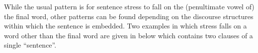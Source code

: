 While the usual pattern is for sentence stress to fall
on the (penultimate vowel of) the final word,
other patterns can be found depending on the discourse
structures within which the sentence is embedded.
Two examples in which stress falls on a word other than
the final word are given in  below
which contains two clauses of a single ``sentence''.

\begin{exe}
\let\eachwordone=\textnormal \let\eachwordtwo=\itshape
	\ex{\begin{xlist}
		\ex{\glll	[haj ʔimɐ ˈmn\tbr{a}ɔ miʔkɔ kuɐn]\\
					\hp{[}hai ima m-n\tbr{a}o mi-ʔko kuan,	\\
					\hp{[}{\hai} {\ima} \m-go \mi-{\qko} village \\
				\glt	\lh{[}`We left the village,
							\txrf{130920-1, 0.40} {\emb{130920-1-00-40.mp3}{\spk{}}{\apl}}}
		\ex{\glll	[ˈʔ\tbr{ɛ}ːs nɛɐn mɛsɛʔ kʲikʊ]\\
						\hp{[}\tbr{e}es nean mese-ʔ kiku.\\
						\hp{[}{\esc} day{\M} one-{\qnum} early.morning\\
				\glt	\lh{[}it was (on) Monday morning.'}
		\end{xlist}}\label{ex:130920-1, 0.40 ch:ph}
\end{exe}